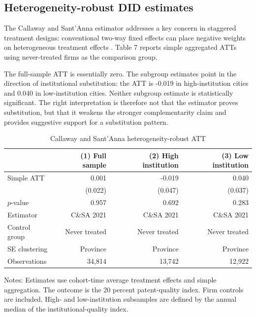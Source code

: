 \documentclass[12pt]{article}
\begin{document}
\subsection{Heterogeneity-robust DID estimates}

The Callaway and Sant'Anna estimator addresses a key concern in staggered treatment designs: conventional two-way fixed effects can place negative weights on heterogeneous treatment effects \citep{goodman2021,callaway2021}. Table 7 reports simple aggregated ATTs using never-treated firms as the comparison group.

The full-sample ATT is essentially zero. The subgroup estimates point in the direction of institutional substitution: the ATT is -0.019 in high-institution cities and 0.040 in low-institution cities. Neither subgroup estimate is statistically significant. The right interpretation is therefore not that the estimator proves substitution, but that it weakens the stronger complementarity claim and provides suggestive support for a substitution pattern.

\begin{table}[htbp]
\centering
\caption{Callaway and Sant'Anna heterogeneity-robust ATT}
\begin{tabular}{lrrr}
\toprule
 & (1) Full sample & (2) High institution & (3) Low institution \\
\midrule
Simple ATT & 0.001 & -0.019 & 0.040 \\
 & (0.022) & (0.047) & (0.037) \\
\(p\)-value & 0.957 & 0.692 & 0.283 \\
Estimator & C\&SA 2021 & C\&SA 2021 & C\&SA 2021 \\
Control group & Never treated & Never treated & Never treated \\
SE clustering & Province & Province & Province \\
Observations & 34,814 & 13,742 & 12,922 \\
\bottomrule
\end{tabular}
\begin{minipage}{0.96\textwidth}
\footnotesize Notes: Estimates use cohort-time average treatment effects and simple aggregation. The outcome is the 20 percent patent-quality index. Firm controls are included. High- and low-institution subsamples are defined by the annual median of the institutional-quality index.
\end{minipage}
\end{table}
\end{document}
